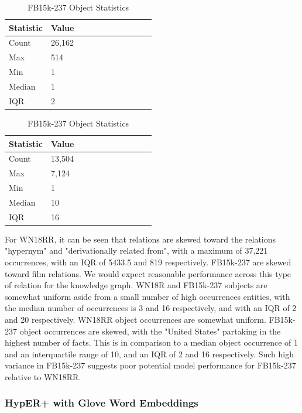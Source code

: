 \begin{table}[H]
	\parbox{.5\linewidth}{
		\caption{WN18RR Object Statistics}
		\centering
		\begin{tabular}{lllllllllll}
  			\textbf{Statistic} & \textbf{Value}  \\
  			\hline
			Count & 26,162 \\
			Max & 514 \\
			Min & 1 \\
  			Median & 1 \\
  			IQR & 2 \\
		\end{tabular}
		}
	\hfill
	\parbox{.5\linewidth}{
		\caption{FB15k-237 Object Statistics}
		\centering
		\begin{tabular}{lllllllllll}
  			\textbf{Statistic} & \textbf{Value}  \\
  			\hline
			Count & 13,504 \\
			Max & 7,124 \\
			Min & 1 \\
  			Median & 10 \\
  			IQR & 16 \\
		\end{tabular}
		}
\end{table}

For WN18RR, it can be seen that relations are skewed toward the relations "hypernym" and "derivationally related from", with a maximum of 37,221 occurrences, with an IQR of 5433.5 and 819 respectively. FB15k-237 are skewed toward film relations. We would expect reasonable performance across this type of relation for the knowledge graph. \newline
WN18R and FB15k-237 subjects are somewhat uniform aside from a small number of high occurrences entities, with the median number of occurrences is 3 and 16 respectively, and with an IQR of 2 and 20 respectively. 
WN18RR object occurrences are somewhat uniform. FB15k-237 object occurrences are skewed, with the "United States" partaking in the highest number of facts. This is in comparison to a median object occurrence of 1 and an interquartile range of 10,
and an IQR of 2 and 16 respectively. Such high variance in FB15k-237 suggests poor potential model performance for FB15k-237 relative to WN18RR.  


\subsubsection{HypER+ with Glove Word Embeddings}

